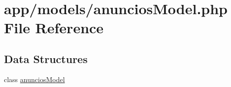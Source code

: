 \hypertarget{anuncios_model_8php}{}\section{app/models/anuncios\+Model.php File Reference}
\label{anuncios_model_8php}
\subsection*{Data Structures}
\begin{DoxyCompactItemize}
\item 
class \hyperlink{classanuncios_model}{anuncios\+Model}
\end{DoxyCompactItemize}
